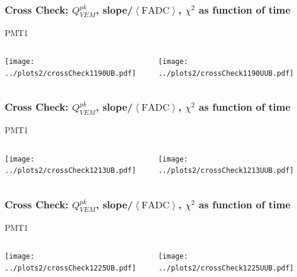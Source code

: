 \documentclass[aspectratio=169]{beamer}
\begin{document}
\begin{frame}
  \frametitle{Cross Check: $Q^{pk}_{VEM}$,
  slope/$\left<\mathrm{FADC}\right>$, $\chi^2$ as function of time}
  PMT1
  \vspace{0.5cm}
  \begin{columns}
    \begin{column}{0.5\textwidth}
      \texttt{[image: ../plots2/crossCheck1190UB.pdf]}
    \end{column}
    \begin{column}{0.5\textwidth}
      \texttt{[image: ../plots2/crossCheck1190UUB.pdf]}
    \end{column}
  \end{columns}
\end{frame}

\begin{frame}
  \frametitle{Cross Check: $Q^{pk}_{VEM}$,
  slope/$\left<\mathrm{FADC}\right>$, $\chi^2$ as function of time}
  PMT1
  \vspace{0.5cm}
  \begin{columns}
    \begin{column}{0.5\textwidth}
      \texttt{[image: ../plots2/crossCheck1213UB.pdf]}
    \end{column}
    \begin{column}{0.5\textwidth}
      \texttt{[image: ../plots2/crossCheck1213UUB.pdf]}
    \end{column}
  \end{columns}
\end{frame}

\begin{frame}
  \frametitle{Cross Check: $Q^{pk}_{VEM}$,
  slope/$\left<\mathrm{FADC}\right>$, $\chi^2$ as function of time}
  PMT1
  \vspace{0.5cm}
  \begin{columns}
    \begin{column}{0.5\textwidth}
      \texttt{[image: ../plots2/crossCheck1225UB.pdf]}
    \end{column}
    \begin{column}{0.5\textwidth}
      \texttt{[image: ../plots2/crossCheck1225UUB.pdf]}
    \end{column}
  \end{columns}
\end{frame}
\end{document}
